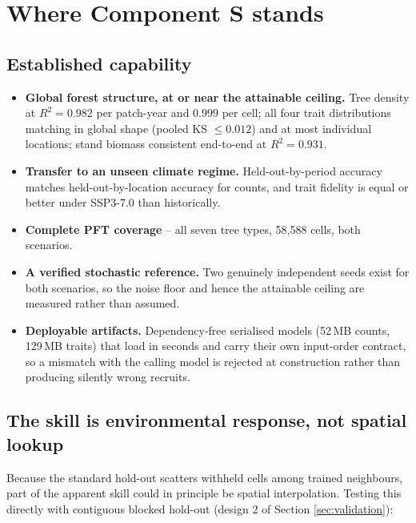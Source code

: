 \documentclass[11pt]{article}
\begin{document}
\clearpage
\section{Where Component S stands}
\label{sec:standing}

\subsection{Established capability}

\begin{itemize}[leftmargin=1.4em]
\item \textbf{Global forest structure, at or near the attainable ceiling.} Tree density at $R^2 = 0.982$ per patch-year and $0.999$ per cell; all four trait distributions matching in global shape (pooled KS $\le 0.012$) and at most individual locations; stand biomass consistent end-to-end at $R^2 = 0.931$.
\item \textbf{Transfer to an unseen climate regime.} Held-out-by-period accuracy matches held-out-by-location accuracy for counts, and trait fidelity is equal or better under SSP3-7.0 than historically.
\item \textbf{Complete PFT coverage} -- all seven tree types, 58{,}588 cells, both scenarios.
\item \textbf{A verified stochastic reference.} Two genuinely independent seeds exist for both scenarios, so the noise floor and hence the attainable ceiling are measured rather than assumed.
\item \textbf{Deployable artifacts.} Dependency-free serialised models (52\,MB counts, 129\,MB traits) that load in seconds and carry their own input-order contract, so a mismatch with the calling model is rejected at construction rather than producing silently wrong recruits.
\end{itemize}

\subsection{The skill is environmental response, not spatial lookup}

Because the standard hold-out scatters withheld cells among trained neighbours, part of the apparent skill could in principle be spatial interpolation. Testing this directly with contiguous blocked hold-out (design 2 of Section \ref{sec:validation}):
\end{document}
